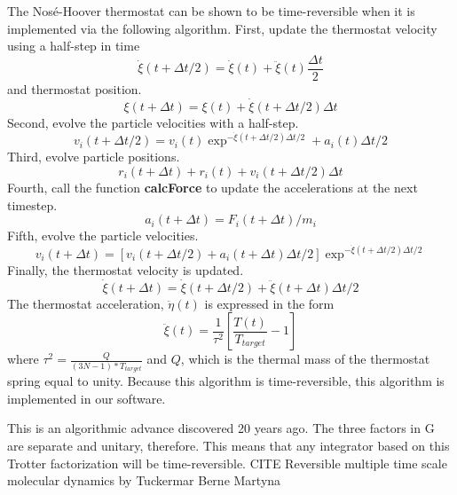 The Nos\'{e}-Hoover thermostat can be shown to be time-reversible when it is implemented via the following algorithm.
First, update the thermostat velocity using a half-step in time
\begin{equation}
\dot{\xi} (t+ \Delta t/2) = \dot{\xi}(t) + \ddot{\xi}(t) \frac{\Delta t}{2}
\end{equation}
and thermostat position.
\begin{equation}
\xi (t+ \Delta t) = \xi(t) + \dot{\xi}(t+\Delta t/2)\Delta t
\end{equation}
Second, evolve the particle velocities with a half-step.
\begin{equation}
v_i (t+\Delta t/2) = v_i (t) \exp^{-\dot{\xi}(t+\Delta t/2) \Delta t/2} + a_{i} (t) \Delta t/2
\end{equation}
Third, evolve particle positions.
\begin{equation}
r_{i} (t+\Delta t) + r_{i} (t) + v_{i}(t+ \Delta t/2) \Delta t
\end{equation}
Fourth, call the function \textbf{calcForce} to update the accelerations at the next timestep.
\begin{equation}
a_{i} (t+\Delta t) = F_{i} (t+ \Delta t)/m_{i}
\end{equation}
Fifth, evolve the particle velocities.
\begin{equation}
v_{i} (t+ \Delta t)  = [v_{i}(t+\Delta t/2) + a_{i}(t+\Delta t) \Delta t/2]\exp^{-\dot{\xi}(t+\Delta t/2) \Delta t/2}
\end{equation}
Finally, the thermostat velocity is updated.
\begin{equation}
\dot{\xi}(t+\Delta t) = \dot{\xi} (t+\Delta t/2) + \ddot{\xi} (t+\Delta t) \Delta t /2
\end{equation}
The thermostat acceleration, $\ddot{\eta}(t)$ is expressed in the form
\begin{equation}
\ddot{\xi}(t) = \frac{1}{\tau^{2}} [\frac{T(t)}{T_{target}} -1 ]
\end{equation}
where $\tau^{2} = \frac{Q}{(3N-1)*T_{target}}$ and $Q$, which is the thermal mass of the thermostat spring equal to unity.
Because this algorithm is time-reversible, this algorithm is implemented in our software.

This is an algorithmic advance discovered 20 years ago.
The three factors in G are separate and unitary, therefore. This means that any integrator  based on this Trotter factorization will be time-reversible. CITE Reversible multiple time scale molecular dynamics by Tuckermar Berne Martyna

